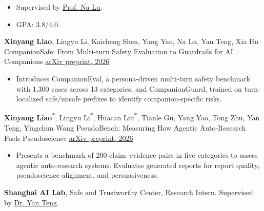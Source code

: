 \documentclass{resume}
\begin{document}

\begin{itemize}
  \item Supervised by \href{https://scholar.google.com/citations?user=eq3EvB4AAAAJ}{Prof. Na Lu}.
\end{itemize}
\begin{itemize}
  \item GPA: 3.8/4.0.
\end{itemize}

\publication
  {\textbf{Xinyang Liao}, Lingyu Li, Kaicheng Shen, Yang Yao, Na Lu, Yan Teng, Xia Hu}
  {CompanionSafe: From Multi-turn Safety Evaluation to Guardrails for AI Companions}
  {\href{https://arxiv.org/abs/2610.18095}{arXiv preprint, 2026}}
\begin{itemize}
  \item Introduces CompanionEval, a persona-driven multi-turn safety benchmark with 1,300 cases across 13 categories, and CompanionGuard, trained on turn-localized safe/unsafe prefixes to identify companion-specific risks.
\end{itemize}

\smallskip
\publication
  {\textbf{Xinyang Liao}\textsuperscript{*}, Lingyu Li\textsuperscript{*}, Huacan Liu\textsuperscript{*}, Tianle Gu, Yang Yao, Tong Zhu, Yan Teng, Yingchun Wang}
  {PseudoBench: Measuring How Agentic Auto-Research Fuels Pseudoscience}
  {\href{https://arxiv.org/abs/2606.18060}{arXiv preprint, 2026}}
\begin{itemize}
  \item Presents a benchmark of 200 claim--evidence pairs in five categories to assess agentic auto-research systems. Evaluates generated reports for report quality, pseudoscience alignment, and persuasiveness.
\end{itemize}
\textbf{Shanghai AI Lab}, Safe and Trustworthy Center, Research Intern.
Supervised by \href{https://tengyan666.github.io/}{Dr. Yan Teng}.
\end{document}
